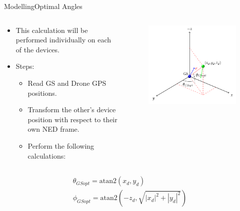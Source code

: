 \begin{frame}{Modelling}{Optimal Angles}
\begin{columns}[T]
    \begin{column}{.5\textwidth}
      \begin{block}{}
        \begin{itemize}
          \item {This calculation will be performed individually on each of the devices.}
          \item {Steps:}
          \begin{itemize}
          \item{Read GS and Drone GPS positions.}
          \item{Transform the other's device position with respect to their own NED frame.}
          \item{Perform the following calculations:}
          \end{itemize}
        \end{itemize}
      \end{block}
    \end{column}

    \begin{column}{.5\textwidth}
    \begin{figure}[H]
    \includegraphics[scale=0.27]{figures/optimal.png}
    \end{figure}
    \end{column}
  \end{columns}
      \begin{align*}      
        \theta_{GSopt} = \text{atan2}\left(x_{d}, y_{d}\right) \nonumber \\
        \phi_{GSopt}=  \text{atan2}\left(-z_{d}, \sqrt{|x_{d}|^{2}+|y_{d}|^{2}}\right)
      \end{align*}
\end{frame}